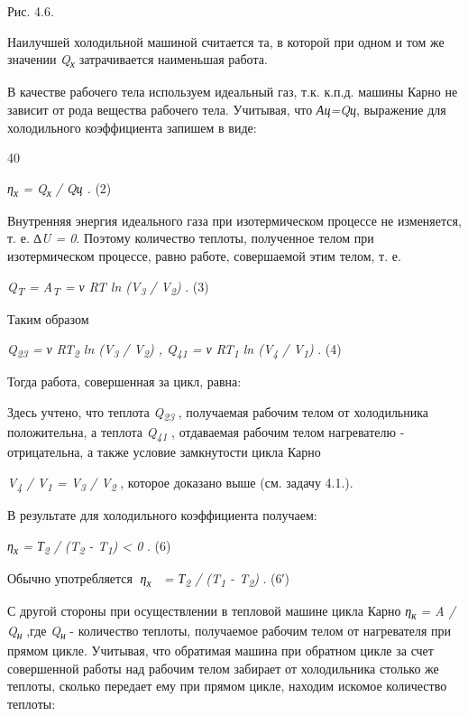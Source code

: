 Рис. 4.6.

Наилучшей холодильной машиной считается та, в которой при одном и том же
значении \emph{Q\textsubscript{х}} затрачивается наименьшая работа.

В качестве рабочего тела используем идеальный газ, т.к. к.п.д. машины
Карно не зависит от рода вещества рабочего тела. Учитывая, что
\emph{Ац=Qц}, выражение для холодильного коэффициента запишем в виде:

40

\emph{η\textsubscript{х} = Q\textsubscript{х} /} \emph{Qц .} (2)

Внутренняя энергия идеального газа при изотермическом процессе не
изменяется, т. е. \emph{∆U = 0}. Поэтому количество теплоты, полученное
телом при изотермическом процессе, равно работе, совершаемой этим телом,
т. е.

\emph{Q\textsubscript{T} = A\textsubscript{T} = ν RT ln
(V\textsubscript{3} / V\textsubscript{2})} . (3)

Таким образом

\emph{Q\textsubscript{23} = ν RT\textsubscript{2} ln (V\textsubscript{3}
/ V\textsubscript{2}) , Q\textsubscript{41} = ν RT\textsubscript{1} ln
(V\textsubscript{4} / V\textsubscript{1})} . (4)

Тогда работа, совершенная за цикл, равна:


Здесь учтено, что теплота \emph{Q\textsubscript{23}} , получаемая
рабочим телом от холодильника положительна, а теплота
\emph{Q\textsubscript{41}} , отдаваемая рабочим телом нагревателю -
отрицательна, а также условие замкнутости цикла Карно

\emph{V\textsubscript{4} / V\textsubscript{1} = V\textsubscript{3} /
V\textsubscript{2}} , которое доказано выше (см. задачу 4.1.).

В результате для холодильного коэффициента получаем:

\emph{η\textsubscript{х} = Т\textsubscript{2} / (T\textsubscript{2} -
T\textsubscript{1}) \textless{} 0} . (6)

Обычно употребляется \emph{η\textsubscript{х}  = Т\textsubscript{2} /
(T\textsubscript{1} - T\textsubscript{2})} . (6′)

С другой стороны при осуществлении в тепловой машине цикла Карно
\emph{η\textsubscript{к} = A / Q\textsubscript{н}} ,где
\emph{Q\textsubscript{н}} - количество теплоты, получаемое рабочим телом
от нагревателя при прямом цикле. Учитывая, что обратимая машина при
обратном цикле за счет совершенной работы над рабочим телом забирает от
холодильника столько же теплоты, сколько передает ему при прямом цикле,
находим искомое количество теплоты:

